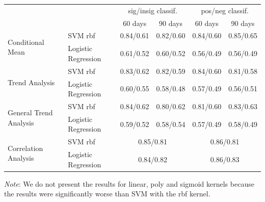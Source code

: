 \documentclass[a0,landscape,beamer]{a0poster}
\begin{document}
\begin{multicols}{4}
\begin{table}[H]
\small
\begin{tabular}{@{}llrrrr@{}}
\toprule
                                                              &                     & \multicolumn{2}{c}{sig/insig classif.} & \multicolumn{2}{c}{pos/neg classif.} \\ 
\cmidrule(r){3-4}
\cmidrule(r){5-6}
                                                              &                     & \multicolumn{1}{c}{60 days} & \multicolumn{1}{c}{90 days} & \multicolumn{1}{c}{60 days} & \multicolumn{1}{c}{90 days} \\ \midrule
\multirow{2}{*}{Conditional Mean}  & SVM rbf             &   0.84/0.61   &  0.82/0.60  & 0.84/0.60 &  0.85/0.65  \\
                                        & Logistic Regression & 0.61/0.52  & 0.60/0.52 &  0.56/0.49   &  0.56/0.49   \\ \midrule
\multirow{2}{*}{Trend Analysis}       & SVM rbf             & 0.83/0.62    &  0.82/0.59 & 0.84/0.60 & 0.81/0.58   \\
                                        & Logistic Regression &  0.60/0.55   & 0.58/0.48 &  0.57/0.49  &  0.56/0.51   \\ \midrule
\multirow{2}{*}{General Trend Analysis} & SVM rbf             & 0.84/0.62 & 0.80/0.62 &  0.81/0.60 &  0.83/0.63  \\
                                       & Logistic Regression &  0.59/0.52  & 0.58/0.54  &   0.57/0.49  &   0.58/0.49       \\ \midrule
\multirow{2}{*}{Correlation Analysis}   & SVM rbf             & \multicolumn{2}{c}{0.85/0.81}  & \multicolumn{2}{c}{0.86/0.81} \\
                                        & Logistic Regression & \multicolumn{2}{c}{0.84/0.82}  & \multicolumn{2}{c}{0.86/0.83} \\
\bottomrule
\end{tabular}
\end{table}

\textit{Note}: We do not present the results for linear, poly and sigmoid kernels because the results were significantly worse than SVM with the rbf kernel.


%



\end{multicols}
\end{document}
